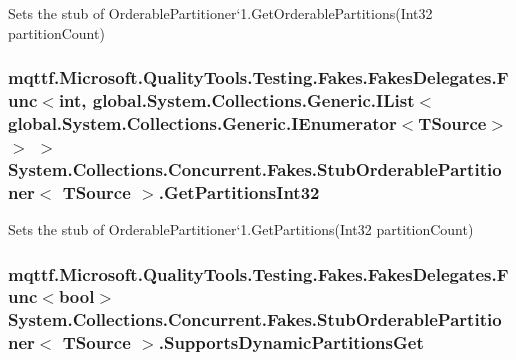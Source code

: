 Sets the stub of Orderable\-Partitioner`1.Get\-Orderable\-Partitions(\-Int32 partition\-Count)

\hypertarget{class_system_1_1_collections_1_1_concurrent_1_1_fakes_1_1_stub_orderable_partitioner_3_01_t_source_01_4_a06bd5c6e9599ee899d64054ec7064363}{
\subsubsection[{Get\-Partitions\-Int32}]{\setlength{\rightskip}{0pt plus 5cm}mqttf.\-Microsoft.\-Quality\-Tools.\-Testing.\-Fakes.\-Fakes\-Delegates.\-Func$<$int, global.\-System.\-Collections.\-Generic.\-I\-List$<$global.\-System.\-Collections.\-Generic.\-I\-Enumerator$<$T\-Source$>$ $>$ $>$ System.\-Collections.\-Concurrent.\-Fakes.\-Stub\-Orderable\-Partitioner$<$ T\-Source $>$.Get\-Partitions\-Int32}}\label{class_system_1_1_collections_1_1_concurrent_1_1_fakes_1_1_stub_orderable_partitioner_3_01_t_source_01_4_a06bd5c6e9599ee899d64054ec7064363}


Sets the stub of Orderable\-Partitioner`1.Get\-Partitions(\-Int32 partition\-Count)

\hypertarget{class_system_1_1_collections_1_1_concurrent_1_1_fakes_1_1_stub_orderable_partitioner_3_01_t_source_01_4_a894b1ce59b770a2afacaa8d744ed5f42}{
\subsubsection[{Supports\-Dynamic\-Partitions\-Get}]{\setlength{\rightskip}{0pt plus 5cm}mqttf.\-Microsoft.\-Quality\-Tools.\-Testing.\-Fakes.\-Fakes\-Delegates.\-Func$<$bool$>$ System.\-Collections.\-Concurrent.\-Fakes.\-Stub\-Orderable\-Partitioner$<$ T\-Source $>$.Supports\-Dynamic\-Partitions\-Get}}\label{class_system_1_1_collections_1_1_concurrent_1_1_fakes_1_1_stub_orderable_partitioner_3_01_t_source_01_4_a894b1ce59b770a2afacaa8d744ed5f42}


